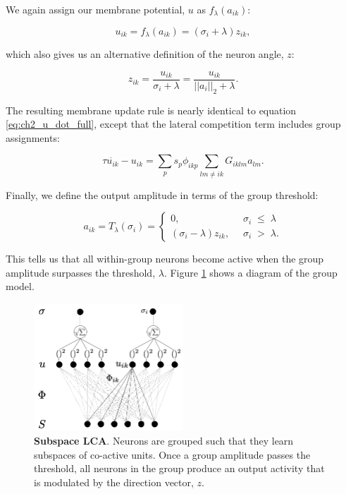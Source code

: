 We again assign our membrane potential, $u$ as $f_{\lambda}(a_{ik})$:

\begin{equation}\label{eq:ch3_u_def}
  u_{ik} = f_{\lambda}(a_{ik}) = (\sigma_{i} + \lambda)z_{ik},
\end{equation}

which also gives us an alternative definition of the neuron angle, $z$:

\begin{equation}\label{eq:ch3_z_u_def}
   z_{ik} = \frac{u_{ik}}{\sigma_{i} + \lambda} = \frac{u_{ik}}{||a_{i}||_{2} + \lambda}.
\end{equation}

The resulting membrane update rule is nearly identical to equation \ref{eq:ch2_u_dot_full}, except that the lateral competition term includes group assignments:

\begin{equation}\label{eq:ch3_subspace_u_dot_def}
   \tau \dot{u_{ik}} - u_{ik} = \sum_{p}s_{p}\phi_{ikp} \sum_{lm \ne ik}G_{iklm}a_{lm}.
\end{equation}

Finally, we define the output amplitude in terms of the group threshold:

\begin{equation}\label{eq:ch3_subspace_threshold_func}
    a_{ik} = T_{\lambda}(\sigma_{i}) = \left\{
    \begin{aligned}
        0,\;\; & \sigma_{i}\; \leq\; \lambda \\
        (\sigma_{i}-\lambda)z_{ik},\;\; &\sigma_{i}\; >\; \lambda.
    \end{aligned}
    \right.
\end{equation}

This tells us that all within-group neurons become active when the group amplitude surpasses the threshold, $\lambda$. Figure \ref{fig:ch3_subspace_lca_graph} shows a diagram of the group model.

\begin{figure}[h]
    \centering
    \includegraphics[width=0.5\textwidth]{figures/subspace_lca_graph.png}
    \caption{\textbf{Subspace LCA}. Neurons are grouped such that they learn subspaces of co-active units. Once a group amplitude passes the threshold, all neurons in the group produce an output activity that is modulated by the direction vector, $z$.}
    \label{fig:ch3_subspace_lca_graph}
\end{figure}

